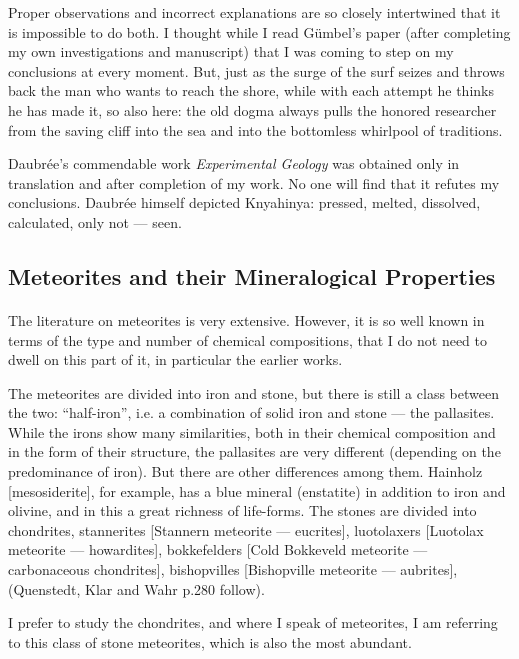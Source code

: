 \documentclass[a4paper, 12pt, oneside]{article}
\begin{document}
Proper observations and incorrect explanations are so closely intertwined that it is impossible to do both. I thought while I read Gümbel's paper (after completing my own investigations and manuscript) that I was coming to step on my conclusions at every moment. But, just as the surge of the surf seizes and throws back the man who wants to reach the shore, while with each attempt he thinks he has made it, so also here: the old dogma always pulls the honored researcher from the saving cliff into the sea and into the bottomless whirlpool of traditions.

Daubrée's commendable work \emph{Experimental Geology} was obtained only in translation and after completion of my work. No one will find that it refutes my conclusions. Daubrée himself depicted Knyahinya: pressed, melted, dissolved, calculated, only not --- seen.
\clearpage
\subsection{Meteorites and their Mineralogical Properties}
\paragraph{}
The literature on meteorites is very extensive. However, it is so well known in terms of the type and number of chemical compositions, that I do not need to dwell on this part of it, in particular the earlier works.

The meteorites are divided into iron and stone, but there is still a class between the two: ``half-iron'', i.e. a combination of solid iron and stone --- the pallasites. While the irons show many similarities, both in their chemical composition and in the form of their structure, the pallasites are very different (depending on the predominance of iron). But there are other differences among them. Hainholz [mesosiderite], for example, has a blue mineral (enstatite) in addition to iron and olivine, and in this a great richness of life-forms. The stones are divided into chondrites, stannerites [Stannern meteorite --- eucrites], luotolaxers [Luotolax meteorite --- howardites], bokkefelders [Cold Bokkeveld meteorite --- carbonaceous chondrites], bishopvilles [Bishopville meteorite --- aubrites], (Quenstedt, Klar and Wahr p.280 follow).

I prefer to study the chondrites, and where I speak of meteorites, I am referring to this class of stone meteorites, which is also the most abundant.
\end{document}
